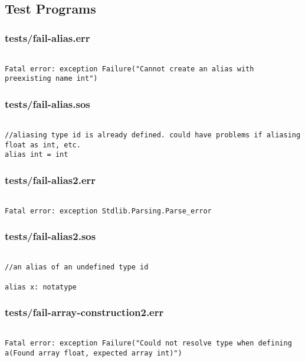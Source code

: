 \documentclass[main.tex]{subfiles}
\begin{document}
\subsection{Test Programs}

\subsubsection{tests/fail-alias.err}

\begin{lstlisting}

Fatal error: exception Failure("Cannot create an alias with preexisting name int")
\end{lstlisting}

\subsubsection{tests/fail-alias.sos}

\begin{lstlisting}

//aliasing type id is already defined. could have problems if aliasing float as int, etc.
alias int = int
\end{lstlisting}

\subsubsection{tests/fail-alias2.err}

\begin{lstlisting}

Fatal error: exception Stdlib.Parsing.Parse_error
\end{lstlisting}

\subsubsection{tests/fail-alias2.sos}

\begin{lstlisting}

//an alias of an undefined type id

alias x: notatype
\end{lstlisting}

\subsubsection{tests/fail-array-construction2.err}

\begin{lstlisting}

Fatal error: exception Failure("Could not resolve type when defining a(Found array float, expected array int)")
\end{lstlisting}
\end{document}
